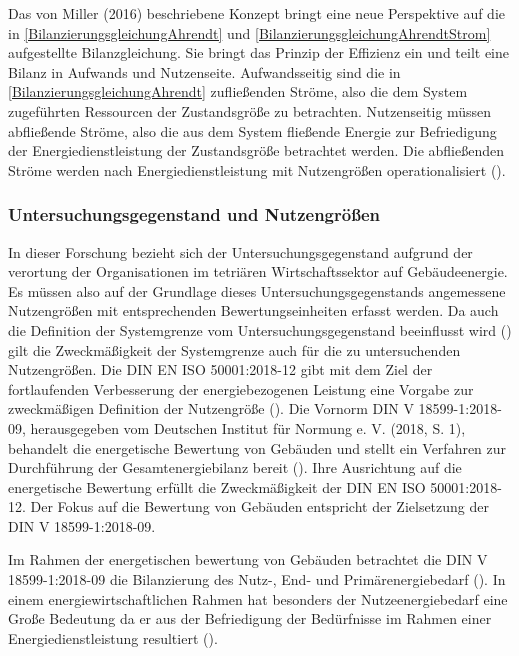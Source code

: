 Das von Miller (2016) beschriebene Konzept bringt eine neue Perspektive auf die in \eqref{BilanzierungsgleichungAhrendt} und \eqref{BilanzierungsgleichungAhrendtStrom} 
aufgestellte Bilanzgleichung. Sie bringt das Prinzip der Effizienz ein und teilt eine Bilanz in Aufwands und Nutzenseite. 
Aufwandsseitig sind die in \eqref{BilanzierungsgleichungAhrendt} zufließenden Ströme, also die dem System zugeführten Ressourcen der Zustandsgröße zu betrachten. 
Nutzenseitig müssen abfließende Ströme, also die aus dem System fließende Energie zur Befriedigung der Energiedienstleistung der Zustandsgröße betrachtet werden. 
Die abfließenden Ströme werden nach Energiedienstleistung mit Nutzengrößen operationalisiert (\cite{Miller.2016}).


\subsubsection{Untersuchungsgegenstand und Nutzengrößen}

In dieser Forschung bezieht sich der Untersuchungsgegenstand aufgrund der verortung der Organisationen im tetriären Wirtschaftssektor auf Gebäudeenergie. 
Es müssen also auf der Grundlage dieses Untersuchungsgegenstands angemessene Nutzengrößen mit entsprechenden Bewertungseinheiten erfasst werden. 
Da auch die Definition der Systemgrenze vom Untersuchungsgegenstand beeinflusst wird (\cite[S. 109]{Miller.2016}) gilt die Zweckmäßigkeit der Systemgrenze 
auch für die zu untersuchenden Nutzengrößen.
Die DIN EN ISO 50001:2018-12 gibt mit dem Ziel der fortlaufenden Verbesserung der energiebezogenen Leistung eine Vorgabe zur zweckmäßigen Definition der Nutzengröße 
(\cite[S. 11]{DIN50001.2018}).
Die Vornorm DIN V 18599-1:2018-09, herausgegeben vom Deutschen Institut für Normung e. V. (2018, S. 1), behandelt die energetische Bewertung von Gebäuden und stellt ein 
Verfahren zur Durchführung der Gesamtenergiebilanz bereit (\cite[S. 9]{DIN18599.2018}). Ihre Ausrichtung auf die energetische Bewertung erfüllt die Zweckmäßigkeit der 
DIN EN ISO 50001:2018-12. Der Fokus auf die Bewertung von Gebäuden entspricht der Zielsetzung der DIN V 18599-1:2018-09. 

Im Rahmen der energetischen bewertung von Gebäuden betrachtet die DIN V 18599-1:2018-09 die Bilanzierung des Nutz-, End- und Primärenergiebedarf (\cite{DIN18599.2018}).
In einem energiewirtschaftlichen Rahmen hat besonders der Nutzeenergiebedarf eine Große Bedeutung da er aus der Befriedigung der Bedürfnisse im Rahmen einer 
Energiedienstleistung resultiert (\cite[S. 107]{Miller.2016}).

